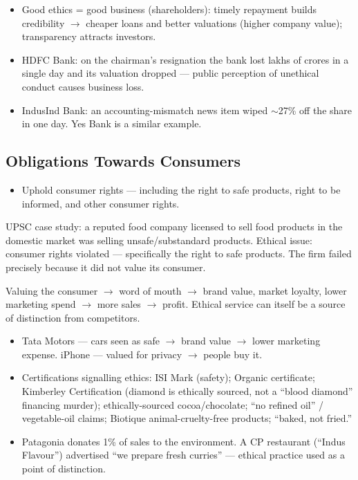 \begin{DataFact}
\begin{itemize}
\item Good ethics = good business (shareholders): timely repayment builds credibility $\rightarrow$ cheaper loans and better valuations (higher company value); transparency attracts investors.
\item HDFC Bank: on the chairman's resignation the bank lost lakhs of crores in a single day and its valuation dropped --- public perception of unethical conduct causes business loss.
\item IndusInd Bank: an accounting-mismatch news item wiped $\sim$27\% off the share in one day. Yes Bank is a similar example.
\end{itemize}
\end{DataFact}

\subsection{Obligations Towards Consumers}
\begin{itemize}
\item Uphold consumer rights --- including the right to safe products, right to be informed, and other consumer rights.
\end{itemize}

\begin{PYQLink}
UPSC case study: a reputed food company licensed to sell food products in the domestic market was selling unsafe/substandard products. Ethical issue: consumer rights violated --- specifically the right to safe products. The firm failed precisely because it did not value its consumer.
\end{PYQLink}

\begin{KeyConcept}
Valuing the consumer $\rightarrow$ word of mouth $\rightarrow$ brand value, market loyalty, lower marketing spend $\rightarrow$ more sales $\rightarrow$ profit. Ethical service can itself be a source of distinction from competitors.
\end{KeyConcept}

\begin{ExampleBox}
\begin{itemize}
\item Tata Motors --- cars seen as safe $\rightarrow$ brand value $\rightarrow$ lower marketing expense. iPhone --- valued for privacy $\rightarrow$ people buy it.
\item Certifications signalling ethics: ISI Mark (safety); Organic certificate; Kimberley Certification (diamond is ethically sourced, not a ``blood diamond'' financing murder); ethically-sourced cocoa/chocolate; ``no refined oil'' / vegetable-oil claims; Biotique animal-cruelty-free products; ``baked, not fried.''
\item Patagonia donates 1\% of sales to the environment. A CP restaurant (``Indus Flavour'') advertised ``we prepare fresh curries'' --- ethical practice used as a point of distinction.
\end{itemize}
\end{ExampleBox}

